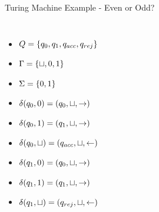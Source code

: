 \documentclass[c]{beamer}
\begin{document}
\begin{frame}{Turing Machine Example - Even or Odd?}
  \begin{columns}[c]
    
    \small


    \begin{itemize}
    \item[] $Q = \{q_0, q_1, q_{acc}, q_{rej}\}$
    \item[] $\Gamma = \{\sqcup, 0, 1\}$
    \item[] $\Sigma = \{0,1\}$
    \item[] $\delta(q_0, 0) = (q_0, \sqcup, \rightarrow)$
    \item[] $\delta(q_0, 1) = (q_1, \sqcup, \rightarrow)$
    \item[] $\delta(q_0, \sqcup) = (q_{acc}, \sqcup, \leftarrow)$
    \item[] $\delta(q_1, 0) = (q_0, \sqcup, \rightarrow)$
    \item[] $\delta(q_1, 1) = (q_1, \sqcup, \rightarrow)$
    \item[] $\delta(q_1, \sqcup) = (q_{rej}, \sqcup, \leftarrow)$
    \end{itemize}

    
      
  \end{columns}
\end{frame}
\end{document}
